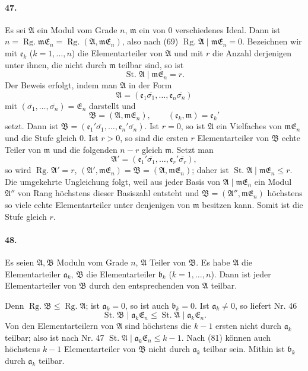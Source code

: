 \documentclass[11pt]{article}
\newcommand{\Rg}{\operatorname{Rg.}}
\newcommand{\St}{\operatorname{St.}}
\begin{document}
\paragraph{47.}
Es sei $\mathfrak A$ ein Modul vom Grade $n$, $\mathfrak m$ ein von $0$ verschiedenes Ideal. Dann ist $n=\Rg\mathfrak m\mathfrak E_n=\Rg(\mathfrak A,
\mathfrak m\mathfrak E_n)$, also nach (69) $\Rg\mathfrak A\mid\mathfrak m\mathfrak E_n=0$. Bezeichnen wir mit $\mathfrak e_k$ ($k=1,
\ldots,n$) die Elementarteiler von $\mathfrak A$ und mit $r$ die Anzahl derjenigen unter ihnen, die nicht durch $\mathfrak m$ teilbar sind, so ist
\[
\St\mathfrak A\mid\mathfrak m\mathfrak E_n=r.
\]
Der Beweis erfolgt, indem man $\mathfrak A$ in der Form
\[
\mathfrak A=(\mathfrak e_1\overline{\sigma_1},
\ldots,
\mathfrak e_n\overline{\sigma_n})
\]
mit $(\overline{\sigma_1},
\ldots,
\overline{\sigma_n})=\mathfrak E_n$ darstellt und
\[
\mathfrak B=(\mathfrak A,
\mathfrak m\mathfrak E_n),
\qquad
(\mathfrak e_k,
\mathfrak m)=\mathfrak e_k'
\]
setzt. Dann ist $\mathfrak B=(\mathfrak e_1'\overline{\sigma_1},
\ldots,
\mathfrak e_n'\overline{\sigma_n})$. Ist $r=0$, so ist $\mathfrak A$ ein Vielfaches von $\mathfrak m\mathfrak E_n$ und die Stufe gleich $0$. Ist $r>0$, so sind die ersten $r$ Elementarteiler von $\mathfrak B$ echte Teiler von $\mathfrak m$ und die folgenden $n-r$ gleich $\mathfrak m$. Setzt man
\[
\mathfrak A'=(\mathfrak e_1'\overline{\sigma_1},
\ldots,
\mathfrak e_r'\overline{\sigma_r}),
\]
so wird $\Rg\mathfrak A'=r$, $(\mathfrak A',
\mathfrak m\mathfrak E_n)=\mathfrak B=(\mathfrak A,
\mathfrak m\mathfrak E_n)$; daher ist $\St\mathfrak A\mid\mathfrak m\mathfrak E_n\le r$. Die umgekehrte Ungleichung folgt, weil aus jeder Basis von $\mathfrak A\mid\mathfrak m\mathfrak E_n$ ein Modul $\mathfrak A''$ von Rang höchstens dieser Basiszahl entsteht und $\mathfrak B=(\mathfrak A'',
\mathfrak m\mathfrak E_n)$ höchstens so viele echte Elementarteiler unter denjenigen von $\mathfrak m$ besitzen kann. Somit ist die Stufe gleich $r$.

\paragraph{48.}
Es seien $\mathfrak A,\mathfrak B$ Moduln vom Grade $n$, $\mathfrak A$ Teiler von $\mathfrak B$. Es habe $\mathfrak A$ die Elementarteiler $\mathfrak a_k$, $\mathfrak B$ die Elementarteiler $\mathfrak b_k$ ($k=1,
\ldots,n$). Dann ist jeder Elementarteiler von $\mathfrak B$ durch den entsprechenden von $\mathfrak A$ teilbar.

Denn $\Rg\mathfrak B\le\Rg\mathfrak A$; ist $\mathfrak a_k=0$, so ist auch $\mathfrak b_k=0$. Ist $\mathfrak a_k\ne0$, so liefert Nr. 46
\[
\St\mathfrak B\mid\mathfrak a_k\mathfrak E_n
\le
\St\mathfrak A\mid\mathfrak a_k\mathfrak E_n.
\tag{81}
\]
Von den Elementarteilern von $\mathfrak A$ sind höchstens die $k-1$ ersten nicht durch $\mathfrak a_k$ teilbar; also ist nach Nr. 47 $\St\mathfrak A\mid\mathfrak a_k\mathfrak E_n\le k-1$. Nach (81) können auch höchstens $k-1$ Elementarteiler von $\mathfrak B$ nicht durch $\mathfrak a_k$ teilbar sein. Mithin ist $\mathfrak b_k$ durch $\mathfrak a_k$ teilbar.
\end{document}
